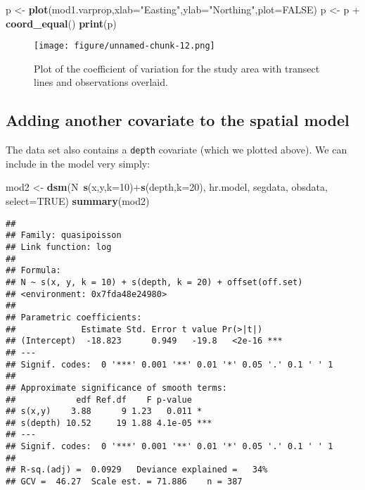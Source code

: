 \documentclass[]{article}
\newenvironment{Shaded}{}{}
\newcommand{\KeywordTok}[1]{\textcolor[rgb]{0.00,0.44,0.13}{\textbf{{#1}}}}
\newcommand{\DataTypeTok}[1]{\textcolor[rgb]{0.56,0.13,0.00}{{#1}}}
\newcommand{\DecValTok}[1]{\textcolor[rgb]{0.25,0.63,0.44}{{#1}}}
\newcommand{\StringTok}[1]{\textcolor[rgb]{0.25,0.44,0.63}{{#1}}}
\newcommand{\OtherTok}[1]{\textcolor[rgb]{0.00,0.44,0.13}{{#1}}}
\newcommand{\NormalTok}[1]{{#1}}
\begin{document}
\begin{Shaded}
\begin{Highlighting}[]
\NormalTok{p <-}\StringTok{ }\KeywordTok{plot}\NormalTok{(mod1.varprop,}\DataTypeTok{xlab=}\StringTok{"Easting"}\NormalTok{,}\DataTypeTok{ylab=}\StringTok{"Northing"}\NormalTok{,}\DataTypeTok{plot=}\OtherTok{FALSE}\NormalTok{)}
\NormalTok{p <-}\StringTok{ }\NormalTok{p +}\StringTok{ }\KeywordTok{coord_equal}\NormalTok{()}
\KeywordTok{print}\NormalTok{(p)}
\end{Highlighting}
\end{Shaded}

\begin{figure}[htbp]
\centering
\texttt{[image: figure/unnamed-chunk-12.png]}
\caption{Plot of the coefficient of variation for the study area with
transect lines and observations overlaid.}
\end{figure}

\subsection{Adding another covariate to the spatial
model}\label{adding-another-covariate-to-the-spatial-model}

The data set also contains a \texttt{depth} covariate (which we plotted
above). We can include in the model very simply:

\begin{Shaded}
\begin{Highlighting}[]
\NormalTok{mod2 <-}\StringTok{ }\KeywordTok{dsm}\NormalTok{(N~}\KeywordTok{s}\NormalTok{(x,y,}\DataTypeTok{k=}\DecValTok{10}\NormalTok{)+}\KeywordTok{s}\NormalTok{(depth,}\DataTypeTok{k=}\DecValTok{20}\NormalTok{), hr.model, segdata, obsdata, }\DataTypeTok{select=}\OtherTok{TRUE}\NormalTok{)}
\KeywordTok{summary}\NormalTok{(mod2)}
\end{Highlighting}
\end{Shaded}

\begin{verbatim}
## 
## Family: quasipoisson 
## Link function: log 
## 
## Formula:
## N ~ s(x, y, k = 10) + s(depth, k = 20) + offset(off.set)
## <environment: 0x7fda48e24980>
## 
## Parametric coefficients:
##             Estimate Std. Error t value Pr(>|t|)    
## (Intercept)  -18.823      0.949   -19.8   <2e-16 ***
## ---
## Signif. codes:  0 '***' 0.001 '**' 0.01 '*' 0.05 '.' 0.1 ' ' 1
## 
## Approximate significance of smooth terms:
##            edf Ref.df    F p-value    
## s(x,y)    3.88      9 1.23   0.011 *  
## s(depth) 10.52     19 1.88 4.1e-05 ***
## ---
## Signif. codes:  0 '***' 0.001 '**' 0.01 '*' 0.05 '.' 0.1 ' ' 1
## 
## R-sq.(adj) =  0.0929   Deviance explained =   34%
## GCV =  46.27  Scale est. = 71.886    n = 387
\end{verbatim}
\end{document}
